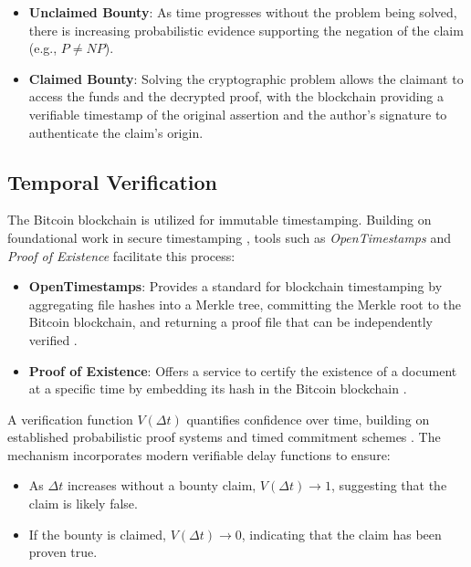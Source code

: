 \documentclass[12pt]{report}
\begin{document}
\begin{itemize}
    \item \textbf{Unclaimed Bounty}: As time progresses without the problem being solved, there is increasing probabilistic evidence supporting the negation of the claim (e.g., \( P \neq NP \)).
    \item \textbf{Claimed Bounty}: Solving the cryptographic problem allows the claimant to access the funds and the decrypted proof, with the blockchain providing a verifiable timestamp of the original assertion and the author's signature to authenticate the claim's origin.
\end{itemize}

\subsection{Temporal Verification}
The Bitcoin blockchain \cite{Nakamoto2008} is utilized for immutable timestamping. Building on foundational work in secure timestamping \cite{HaberStornetta1991}, tools such as \textit{OpenTimestamps} and \textit{Proof of Existence} facilitate this process:

\begin{itemize}
    \item \textbf{OpenTimestamps}: Provides a standard for blockchain timestamping by aggregating file hashes into a Merkle tree, committing the Merkle root to the Bitcoin blockchain, and returning a proof file that can be independently verified \cite{opentimestamps}.
    \item \textbf{Proof of Existence}: Offers a service to certify the existence of a document at a specific time by embedding its hash in the Bitcoin blockchain \cite{proofofexistence}.
\end{itemize}

A verification function \( V(\Delta t) \) quantifies confidence over time, building on established probabilistic proof systems \cite{BabaiMoran1988} and timed commitment schemes \cite{BonehNaor2000}. The mechanism incorporates modern verifiable delay functions \cite{BonehBunzFisch2018} to ensure:

\begin{itemize}
    \item As \( \Delta t \) increases without a bounty claim, \( V(\Delta t) \rightarrow 1 \), suggesting that the claim is likely false.
    \item If the bounty is claimed, \( V(\Delta t) \rightarrow 0 \), indicating that the claim has been proven true.
\end{itemize}
\end{document}
